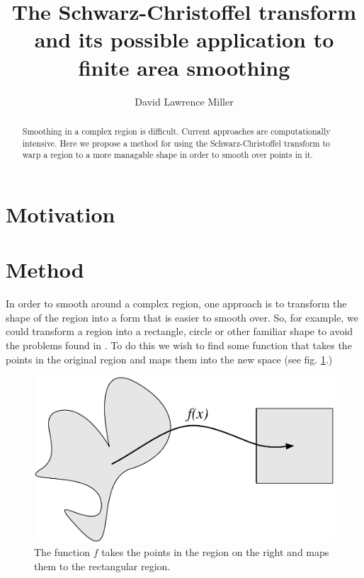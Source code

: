 \documentclass[a4paper,10pt]{amsart}
\title{The Schwarz-Christoffel transform and its possible application to finite area smoothing}
\author{David Lawrence Miller}
\newcommand{\sch}{Schwarz-Christoffel }
\begin{document}
 
\begin{abstract}
Smoothing in a complex region is difficult. Current approaches are computationally intensive. Here we propose a method for using the \sch transform to warp a region to a more managable shape in order to smooth over points in it.
\end{abstract}
 
 
\newtheorem{thm}{Theorem}[section]
 
\newtheorem{defn}{Definition}[section]
 
\maketitle



\section{Motivation}



\section{Method}

In order to smooth around a complex region, one approach is to transform the shape of the region into a form that is easier to smooth over. So, for example, we could transform a region into a rectangle, circle or other familiar shape to avoid the problems found in \cite{ramsay}. To do this we wish to find some function that takes the points in the original region and maps them into the new space (see fig. \ref{simpledia}.)

\begin{figure} [tbp]
\centering
\includegraphics[scale=0.3]{figs/simpledia.pdf}
\caption{The function $f$ takes the points in the region on the right and maps them to the rectangular region.}
\label{simpledia}
\end{figure}
\end{document}
